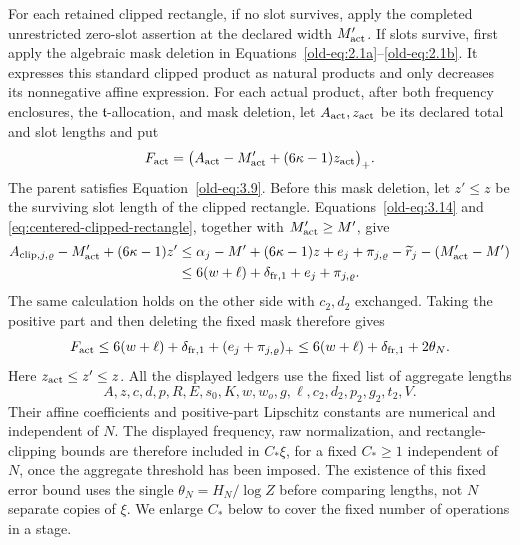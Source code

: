 \documentclass[12pt]{article}
\begin{document}
For each retained clipped rectangle, if no slot survives, apply the
completed unrestricted zero-slot assertion at the declared width
\(M'_{\rm act}\).  If slots survive, first apply the algebraic mask deletion in
Equations~\eqref{old-eq:2.1a}--\eqref{old-eq:2.1b}.
It expresses this standard clipped product as natural products and only
decreases its nonnegative affine expression.  For each actual product, after both frequency
enclosures, the \(\mathfrak t\)-allocation, and mask deletion, let
\(A_{\rm act},z_{\rm act}\) be its declared total and slot lengths
and put
\[
 F_{\rm act}
 =\bigl(A_{\rm act}-M'_{\rm act}+(6\kappa-1)z_{\rm act}\bigr)_+.
\]
The parent satisfies Equation~\eqref{old-eq:3.9}.  Before this mask
deletion, let \(z'\le z\) be the surviving slot length of the clipped
rectangle.  Equations~\eqref{old-eq:3.14} and
\eqref{eq:centered-clipped-rectangle}, together with \(M'_{\rm act}\ge M'\), give
\[
 \begin{split}
 A_{{\rm clip},j,\varrho}-M'_{\rm act}+(6\kappa-1)z'
 &\le \alpha_j-M'+(6\kappa-1)z
       +e_j+\pi_{j,\varrho}-\widetilde r_j-(M'_{\rm act}-M')\\
 &\le6(w+\ell)+\delta_{{\rm fr},1}+e_j+\pi_{j,\varrho}.
 \end{split}
\]
The same calculation holds on the other side with \(c_2,d_2\) exchanged.
Taking the positive part and then deleting the fixed mask therefore gives
\[
 F_{\rm act}\le6(w+\ell)+\delta_{{\rm fr},1}
                 +(e_j+\pi_{j,\varrho})_+
 \le6(w+\ell)+\delta_{{\rm fr},1}+2\theta_N.
\]
Here \(z_{\rm act}\le z'\le z\).  All the displayed ledgers use the fixed list
of aggregate lengths
\[
 A,z,c,d,p,R,E,s_0,K,w,w_o,g,\ell,c_2,d_2,p_2,g_2,t_2,V.
\]
Their affine coefficients and positive-part Lipschitz constants are
numerical and independent of \(N\).  The displayed frequency, raw
normalization, and rectangle-clipping bounds are therefore included in
\(C_*\xi\), for a fixed \(C_*\ge1\) independent of \(N\), once the
aggregate threshold has been imposed.  The existence of this fixed error bound uses the single
\(\theta_N=H_N/\log Z\) before comparing lengths, not \(N\) separate
copies of \(\xi\).  We enlarge \(C_*\) below to cover the fixed number
of operations in a stage.
\end{document}

